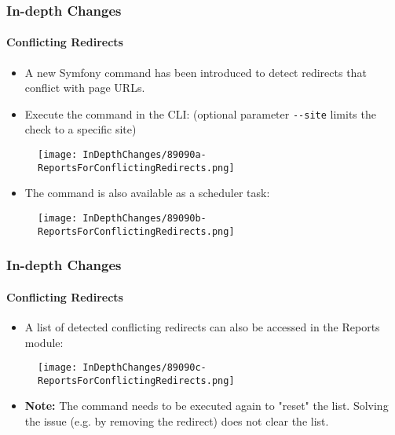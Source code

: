 \begin{frame}[fragile]
	\frametitle{In-depth Changes}
	\framesubtitle{Conflicting Redirects}

	\begin{itemize}
		\item A new Symfony command has been introduced to detect redirects
			that conflict with page URLs.
		\item Execute the command in the CLI:\newline
			\smaller
				(optional parameter \texttt{-}\texttt{-site} limits the check to a specific site)
			\normalsize
	\end{itemize}

	\begin{figure}
		\texttt{[image: InDepthChanges/89090a-ReportsForConflictingRedirects.png]}
	\end{figure}

	\begin{itemize}
		\item The command is also available as a scheduler task:
	\end{itemize}

	\begin{figure}
		\texttt{[image: InDepthChanges/89090b-ReportsForConflictingRedirects.png]}
	\end{figure}

\end{frame}


\begin{frame}[fragile]
	\frametitle{In-depth Changes}
	\framesubtitle{Conflicting Redirects}

	\begin{itemize}
		\item A list of detected conflicting redirects can also be accessed in the Reports module:
	\end{itemize}

	\begin{figure}
		\texttt{[image: InDepthChanges/89090c-ReportsForConflictingRedirects.png]}
	\end{figure}

	\begin{itemize}
		\item
			\small\textbf{Note:}
				The command needs to be executed again to "reset" the list.
				Solving the issue (e.g. by removing the redirect) does not clear the list.
			\normalsize
	\end{itemize}

\end{frame}

